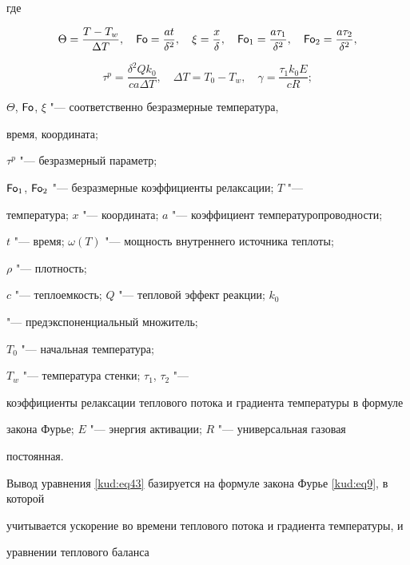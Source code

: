 где 

$$

\Theta =\frac{T-T_{w}}{\Delta T},

\quad  \operatorname{\sf Fo}=\frac{at}{\delta^2}, 

\quad \xi =\frac{x}{\delta },

\quad \operatorname{\sf Fo}_1 =\frac{a\tau _1}{\delta^2},

\quad \operatorname{\sf Fo}_2 =\frac{a\tau _2 }{\delta ^2},

$$ 

$$

\tau^p =\frac{\delta^2Qk_0 }{ca\Delta T}, 

\quad \Delta T=T_0 -T_{w},

\quad \gamma = \frac{\tau _1 k_0 E}{cR};

$$

 $\Theta$, $\operatorname{\sf Fo}$, $\xi$ "--- соответственно безразмерные температура,

время, координата; 

$\tau^p $ "--- безразмерный параметр; 

$\operatorname{\sf Fo}_1$, $\operatorname{\sf Fo}_2 $ "--- безразмерные коэффициенты релаксации; $T$ "---

температура; $x$ "--- координата; $a$ "--- коэффициент температуропроводности;

$t$ "--- время; $\omega (T)$ "--- мощность внутреннего источника теплоты; 

$\rho $ "--- плотность; 

$c$ "--- теплоемкость; $Q$ "--- тепловой эффект реакции; $k_0$

"--- предэкспоненциальный множитель; 

$T_0 $ "--- начальная температура;

$T_{w} $ "--- температура стенки; $\tau _1$, $\tau_2$ "---

коэффициенты релаксации теплового потока и градиента температуры в формуле

закона Фурье; $E$ "--- энергия активации; $R$ "--- универсальная газовая

постоянная.



Вывод уравнения \eqref{kud:eq43} базируется на формуле закона Фурье \eqref{kud:eq9}, в которой

учитывается ускорение во времени теплового потока и градиента температуры, и

уравнении теплового баланса

